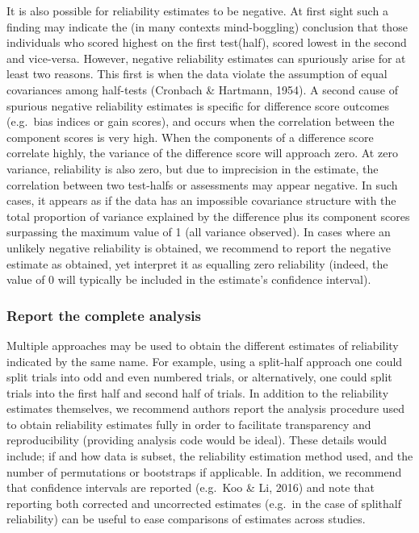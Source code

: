 \documentclass[english,,man,floatsintext]{apa6}
\begin{document}
It is also possible for reliability estimates to be negative. At first sight such a finding may indicate the (in many contexts mind-boggling) conclusion that those individuals who scored highest on the first test(half), scored lowest in the second and vice-versa. However, negative reliability estimates can spuriously arise for at least two reasons. This first is when the data violate the assumption of equal covariances among half-tests (Cronbach \& Hartmann, 1954). A second cause of spurious negative reliability estimates is specific for difference score outcomes (e.g.~bias indices or gain scores), and occurs when the correlation between the component scores is very high. When the components of a difference score correlate highly, the variance of the difference score will approach zero. At zero variance, reliability is also zero, but due to imprecision in the estimate, the correlation between two test-halfs or assessments may appear negative. In such cases, it appears as if the data has an impossible covariance structure with the total proportion of variance explained by the difference plus its component scores surpassing the maximum value of 1 (all variance observed). In cases where an unlikely negative reliability is obtained, we recommend to report the negative estimate as obtained, yet interpret it as equalling zero reliability (indeed, the value of 0 will typically be included in the estimate's confidence interval).

\hypertarget{report-the-complete-analysis}{%
\subsubsection{Report the complete analysis}\label{report-the-complete-analysis}}

Multiple approaches may be used to obtain the different estimates of reliability indicated by the same name. For example, using a split-half approach one could split trials into odd and even numbered trials, or alternatively, one could split trials into the first half and second half of trials. In addition to the reliability estimates themselves, we recommend authors report the analysis procedure used to obtain reliability estimates fully in order to facilitate transparency and reproducibility (providing analysis code would be ideal). These details would include; if and how data is subset, the reliability estimation method used, and the number of permutations or bootstraps if applicable. In addition, we recommend that confidence intervals are reported (e.g.~Koo \& Li, 2016) and note that reporting both corrected and uncorrected estimates (e.g.~in the case of splithalf reliability) can be useful to ease comparisons of estimates across studies.
\end{document}

